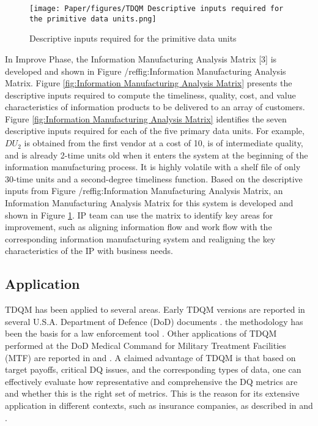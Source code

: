 \documentclass[pdftex,english,oribibl]{llncs}
\begin{document}
\begin{figure}
    \centering
    \texttt{[image: Paper/figures/TDQM Descriptive inputs required for the primitive data units.png]}
    \caption{Descriptive inputs required for the primitive data units \cite{Ballou1998ModelingInformation}}
    \label{fig:Descriptive inputs required for the primitive data units}
 \end{figure}

In Improve Phase, the Information Manufacturing Analysis Matrix [3] is developed and shown in Figure /ref{fig:Information Manufacturing Analysis Matrix}. Figure \ref{fig:Information Manufacturing Analysis Matrix} presents the descriptive inputs required to compute the timeliness, quality, cost, and value characteristics of information products to be delivered to an array of customers. Figure \ref{fig:Information Manufacturing Analysis Matrix} identifies the seven descriptive inputs required for each of the five primary data units. For example, $DU_{2}$ is obtained from the first vendor at a cost of 10, is of intermediate quality, and is already 2-time units old when it enters the system at the beginning of the information manufacturing process. It is highly volatile with a shelf file of only 30-time units and a second-degree timeliness function. Based on the descriptive inputs from Figure /ref{fig:Information Manufacturing Analysis Matrix}, an Information Manufacturing Analysis Matrix for this system is developed and shown in Figure \ref{fig:Descriptive inputs required for the primitive data units}.
 IP team can use the matrix to identify key areas for improvement, such as aligning information flow and work flow with the corresponding information manufacturing system and realigning the key characteristics of the IP with business needs.

\subsection{Application}
TDQM has been applied to several areas. Early TDQM versions are reported in several U.S.A. Department of Defence (DoD) documents \cite{DoD1994}. the methodology has been the basis for a law enforcement tool \citep{Sessions2007EmployingTT}. Other applications of TDQM performed at the DoD Medical Command for Military Treatment Facilities (MTF) are reported in \citet{Wang1998TDQM} and \citet{COREY1996}. A claimed advantage of TDQM is that based on target payoffs, critical DQ issues, and the corresponding types of data, one can effectively evaluate how representative and comprehensive the DQ metrics are and whether this is the right set of metrics. This is the reason for its extensive application in different contexts, such as insurance companies, as described in \citet{Nadkarni2006} and  \citet{Patrick2005}.
\end{document}
